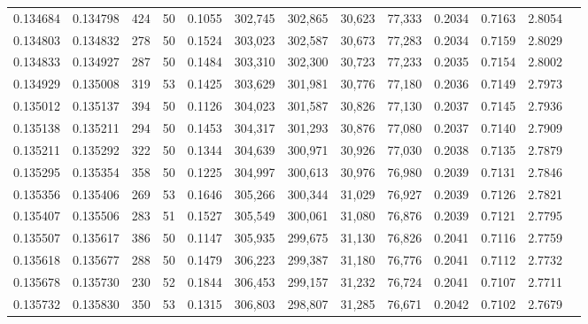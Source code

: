 \begin{tabular}{rrrrrrrrrrrrr}
0.134684 & 0.134798 &   424 &  50 &                                     0.1055 & 302,745 & 302,865 &  30,623 &  77,333 & 0.2034 & 0.7163 & 2.8054 \\
0.134803 & 0.134832 &   278 &  50 &                                     0.1524 & 303,023 & 302,587 &  30,673 &  77,283 & 0.2034 & 0.7159 & 2.8029 \\
0.134833 & 0.134927 &   287 &  50 &                                     0.1484 & 303,310 & 302,300 &  30,723 &  77,233 & 0.2035 & 0.7154 & 2.8002 \\
0.134929 & 0.135008 &   319 &  53 &                                     0.1425 & 303,629 & 301,981 &  30,776 &  77,180 & 0.2036 & 0.7149 & 2.7973 \\
0.135012 & 0.135137 &   394 &  50 &                                     0.1126 & 304,023 & 301,587 &  30,826 &  77,130 & 0.2037 & 0.7145 & 2.7936 \\
0.135138 & 0.135211 &   294 &  50 &                                     0.1453 & 304,317 & 301,293 &  30,876 &  77,080 & 0.2037 & 0.7140 & 2.7909 \\
0.135211 & 0.135292 &   322 &  50 &                                     0.1344 & 304,639 & 300,971 &  30,926 &  77,030 & 0.2038 & 0.7135 & 2.7879 \\
0.135295 & 0.135354 &   358 &  50 &                                     0.1225 & 304,997 & 300,613 &  30,976 &  76,980 & 0.2039 & 0.7131 & 2.7846 \\
0.135356 & 0.135406 &   269 &  53 &                                     0.1646 & 305,266 & 300,344 &  31,029 &  76,927 & 0.2039 & 0.7126 & 2.7821 \\
0.135407 & 0.135506 &   283 &  51 &                                     0.1527 & 305,549 & 300,061 &  31,080 &  76,876 & 0.2039 & 0.7121 & 2.7795 \\
0.135507 & 0.135617 &   386 &  50 &                                     0.1147 & 305,935 & 299,675 &  31,130 &  76,826 & 0.2041 & 0.7116 & 2.7759 \\
0.135618 & 0.135677 &   288 &  50 &                                     0.1479 & 306,223 & 299,387 &  31,180 &  76,776 & 0.2041 & 0.7112 & 2.7732 \\
0.135678 & 0.135730 &   230 &  52 &                                     0.1844 & 306,453 & 299,157 &  31,232 &  76,724 & 0.2041 & 0.7107 & 2.7711 \\
0.135732 & 0.135830 &   350 &  53 &                                     0.1315 & 306,803 & 298,807 &  31,285 &  76,671 & 0.2042 & 0.7102 & 2.7679 \\

\end{tabular}
